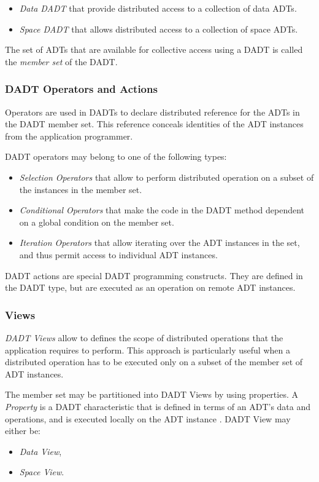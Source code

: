 \begin{itemize}
  \item \emph{Data DADT} that provide distributed access to a collection of data
  ADTs.
  \item \emph{Space DADT} that allows distributed access to a collection of
  space ADTs. 
\end{itemize}

The set of ADTs that are available for collective access using a DADT is called the \emph{member set} of
the DADT.

\subsubsection{DADT Operators and Actions} \label{subsubsec:OperatorsAndActions}

Operators are used in DADTs to declare distributed reference for
the ADTs in the DADT member set. This reference conceals identities of the ADT
instances from the application programmer. 

DADT operators may belong to one of the following types:

\begin{itemize}
  \item \emph{Selection Operators} that allow to perform
  distributed operation on a subset of the instances in the member set.
  \item \emph{Conditional Operators} that make the code in the
  DADT method dependent on a global condition on the member set. 
  \item \emph{Iteration Operators} that allow iterating over the
  ADT instances in the set, and thus permit access to individual ADT instances.
\end{itemize}

DADT actions are special DADT programming constructs. They are defined in the
DADT type, but are executed as an operation on remote ADT instances. 


\subsubsection{Views} \label{subsubsec:views}

\emph{DADT Views} allow to defines the scope of distributed operations
that the application requires to perform. This approach is particularly useful
when a distributed operation has to be executed only on a subset of the
member set of ADT instances.

The member set may be partitioned into DADT Views by using properties. A
\emph{Property} is a DADT characteristic that is defined in terms of an ADT's
data and operations, and is executed locally on the ADT instance
\cite{migliavacca_DADT:2006}.
DADT View may either be:
\begin{itemize}
  \item \emph{Data View},
  \item \emph{Space View}.
\end{itemize}

